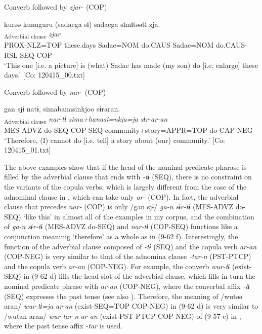 \exi{} Converb followed by \textit{zjar-} (COP)

\ex \relax [= (8-123 a)]%
    \glll  kurəə  kunuguru  (sadaega  sɨ)   sadaega  sɨmɨtəətɨ  zja.\\
      [\textit{ku-rɨ=ja}  \textit{kunuguru}  \textit{sadae=ga}  \textit{sɨmɨr}   \textit{sadae=ga}  \textit{sɨmɨr-təər-tɨ}]\textsubscript{Adverbial clause}  \textit{zjar}\\
      PROX-NLZ=TOP  these.days  Sadae=NOM  do.CAUS   Sadae=NOM  do.CAUS-RSL-SEQ  COP\\      
      \glt ‘This one [i.e. a picture] is (what) Sadae has made (my son) do [i.e. enlarge] these days.’   [Co: 120415\_00.txt]

\exi{}  Converb followed by \textit{nar-} (COP)

\ex %
     \glll  gan  sjɨ  natɨ,  simabanasinkjoo  sɨraran.\\
      [\textit{ga-n}  \textit{sɨr-tɨ}]\textsubscript{Adverbial clause}  \textit{nar-tɨ}  \textit{sima+hanasi=nkja=ja}  \textit{sɨr-ar-an}\\
      MES-ADVZ  do-SEQ  COP-SEQ  community+story=APPR=TOP   do-CAP-NEG\\
      \glt       ‘Therefore, (I) cannot do [i.e. tell] a story about (our) community.’ [Co: 120415\_01.txt]
    \z
\z

The above examples show that if the head of the nominal predicate pharase is filled by the adverbial clause that ends with \textit{{}-tɨ} (SEQ), there is no constraint on the variants of the copula verbs, which is largely different from the case of the adnominal clause in , which can take only \textit{ar-} (COP). In fact, the adverbial clause that precedes \textit{nar-} (COP) is only /gan sjɨ/ \textit{ga-n} \textit{sɨr-tɨ} (MES-ADVZ do-SEQ) ‘like this’ in almost all of the examples in my corpus, and the combination of \textit{ga-n} \textit{sɨr-tɨ} (MES-ADVZ do-SEQ) and \textit{nar-tɨ} (COP-SEQ) functions like a conjunction meaninig ‘therefore’ as a whole as in (9-62 f). Interestingly, the function of the adverbial clause composed of \textit{{}-tɨ} (SEQ) and the copula verb \textit{ar-an} (COP-NEG) is very similar to that of the adnomina clause \textit{{}-tar-n} (PST-PTCP) and the copula verb \textit{ar-an} (COP-NEG). For example, the converb \textit{wur-tɨ} (exist-SEQ) in (9-62 d) fills the head slot of the adverbial clause, which fills in turn the nominal predicate phrase with \textit{ar-an} (COP-NEG), where the converbal affix \textit{{}-tɨ} (SEQ) expresses the past tense (see also ). Therefore, the meaning of /wutəə aran/ \textit{wur-tɨ=ja} \textit{ar-an} (exist-SEQ=TOP COP-NEG) in (9-62 d) is very similar to /wutan aran/ \textit{wur-tar-n} \textit{ar-an} (exist-PST-PTCP COP-NEG) of (9-57 c) in , where the past tense affix \textit{-tar} is used.

